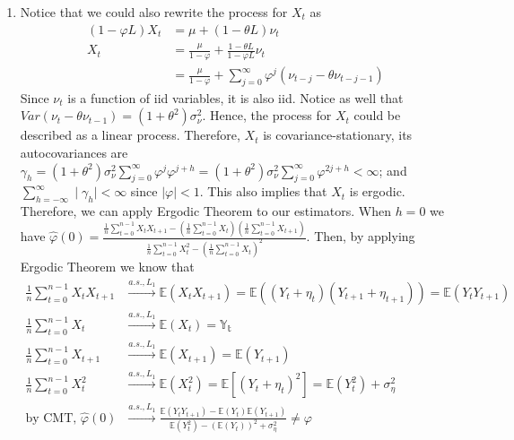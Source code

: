 \documentclass[]{article}
\begin{document}
\begin{enumerate}[label=\alph*)]
	\item Notice that we could also rewrite the process for $X_t$ as
	\begin{equation}
		\begin{split}
		(1- \varphi L)X_t& = \mu + (1 - \theta L)\nu_t \\ \nonumber
		X_t& = \frac{\mu}{1- \varphi} + \frac{1 - \theta L}{1- \varphi L}\nu_t \\
		& = \frac{\mu}{1- \varphi} + \sum\limits_{j = 0}^{\infty}\varphi^j(\nu_{t-j} - \theta\nu_{t-j-1})
		\end{split}
	\end{equation}
	Since $\nu_t$ is a function of iid variables, it is also iid. Notice as well that $Var(\nu_t - \theta\nu_{t-1}) = (1+\theta^2)\sigma_\nu^2$. Hence, the process for $X_t$ could be described as a linear process. Therefore, $X_t$ is covariance-stationary, its autocovariances are $\gamma_h = (1+\theta^2)\sigma_\nu^2\sum\limits_{j = 0}^{\infty}\varphi^j\varphi^{j + h} = (1+\theta^2)\sigma_\nu^2\sum\limits_{j = 0}^{\infty}\varphi^{2j + h} < \infty$; and $\sum\limits_{h = -\infty}^{\infty}\mid\gamma_h\mid < \infty$ since $\mid\varphi\mid < 1$. This also implies that $X_t$ is ergodic. Therefore, we can apply Ergodic Theorem to our estimators.
	When $h = 0$ we have $\hat{\varphi}(0) = \frac{\frac{1}{n}\sum\limits_{t = 0}^{n-1}X_tX_{t+1} - (\frac{1}{n}\sum\limits_{t = 0}^{n-1}X_t)(\frac{1}{n}\sum\limits_{t = 0}^{n-1}X_{t+1})}{\frac{1}{n}\sum\limits_{t = 0}^{n-1}X_t^2 - (\frac{1}{n}\sum\limits_{t = 0}^{n-1}X_t)^2}$. Then, by applying Ergodic Theorem we know that
	\begin{equation}
		\begin{split}
		\frac{1}{n}\sum\limits_{t = 0}^{n-1}X_tX_{t+1}&\overset{a.s., L_1}{\longrightarrow}\mathbb{E}(X_tX_{t+1}) = \mathbb{E}((Y_t + \eta_t)(Y_{t+1} + \eta_{t+1})) = \mathbb{E}(Y_tY_{t+1}) \\ \nonumber
		\frac{1}{n}\sum\limits_{t = 0}^{n-1}X_t&\overset{a.s., L_1}{\longrightarrow}\mathbb{E}(X_t) = \mathbb{Y_t} \\
		\frac{1}{n}\sum\limits_{t = 0}^{n-1}X_{t+1}&\overset{a.s., L_1}{\longrightarrow}\mathbb{E}(X_{t+1}) = \mathbb{E}(Y_{t+1})\\
		\frac{1}{n}\sum\limits_{t = 0}^{n-1}X_t^2&\overset{a.s., L_1}{\longrightarrow}\mathbb{E}(X_t^2) = \mathbb{E}[(Y_t + \eta_t)^2] = \mathbb{E}(Y_t^2) + \sigma_\eta^2\\
		\text{by CMT, }\hat{\varphi}(0)&\overset{a.s., L_1}{\longrightarrow}\frac{\mathbb{E}(Y_tY_{t+1}) - \mathbb{E}(Y_t)\mathbb{E}(Y_{t+1})}{\mathbb{E}(Y_t^2) - (\mathbb{E}(Y_t))^2 + \sigma_\eta^2} \neq \varphi

\end{split}
\end{equation}
\end{enumerate}
\end{document}
